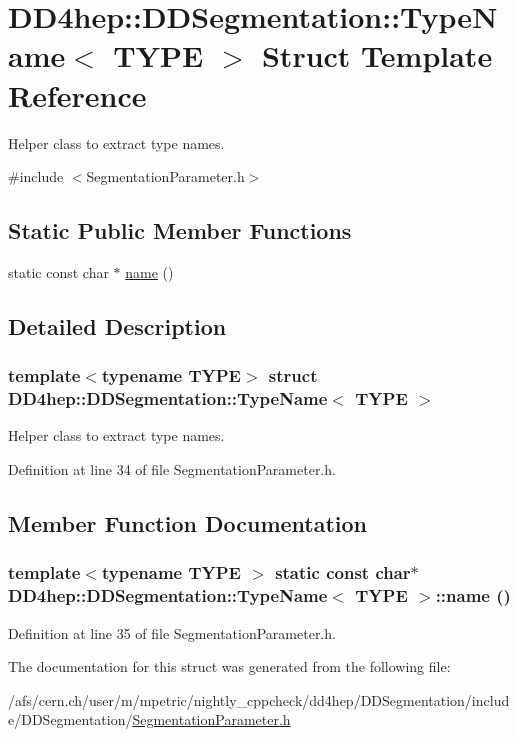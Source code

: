 \hypertarget{struct_d_d4hep_1_1_d_d_segmentation_1_1_type_name}{
\section{DD4hep::DDSegmentation::TypeName$<$ TYPE $>$ Struct Template Reference}
\label{struct_d_d4hep_1_1_d_d_segmentation_1_1_type_name}
}


Helper class to extract type names.  


{\ttfamily \#include $<$SegmentationParameter.h$>$}\subsection*{Static Public Member Functions}
\begin{DoxyCompactItemize}
\item 
static const char $\ast$ \hyperlink{struct_d_d4hep_1_1_d_d_segmentation_1_1_type_name_a3156caa4f8240de7d49d7388ea1545c3}{name} ()
\end{DoxyCompactItemize}


\subsection{Detailed Description}
\subsubsection*{template$<$typename TYPE$>$ struct DD4hep::DDSegmentation::TypeName$<$ TYPE $>$}

Helper class to extract type names. 

Definition at line 34 of file SegmentationParameter.h.

\subsection{Member Function Documentation}
\hypertarget{struct_d_d4hep_1_1_d_d_segmentation_1_1_type_name_a3156caa4f8240de7d49d7388ea1545c3}{
\subsubsection[{name}]{\setlength{\rightskip}{0pt plus 5cm}template$<$typename TYPE $>$ static const char$\ast$ {\bf DD4hep::DDSegmentation::TypeName}$<$ TYPE $>$::name ()}}
\label{struct_d_d4hep_1_1_d_d_segmentation_1_1_type_name_a3156caa4f8240de7d49d7388ea1545c3}


Definition at line 35 of file SegmentationParameter.h.

The documentation for this struct was generated from the following file:\begin{DoxyCompactItemize}
\item 
/afs/cern.ch/user/m/mpetric/nightly\_\-cppcheck/dd4hep/DDSegmentation/include/DDSegmentation/\hyperlink{_segmentation_parameter_8h}{SegmentationParameter.h}\end{DoxyCompactItemize}
